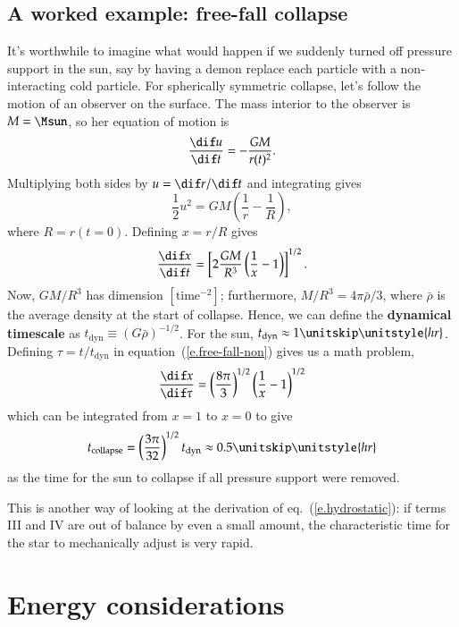 \subsection{A worked example: free-fall collapse}

It's worthwhile to imagine what would happen if we suddenly turned off pressure support in the sun, say by having a demon replace each particle with a non-interacting cold particle. For spherically symmetric collapse, let's follow the motion of an observer on the surface.  The mass interior to the observer is $M = \Msun$, so her equation of motion is
\begin{equation}\label{e.free-fall-eq-motion}
\frac{\dif u}{\dif t} = -\frac{GM}{r(t)^{2}}.
\end{equation}
Multiplying both sides by $u = \dif r/\dif t$ and integrating gives
\[
\frac{1}{2} u^{2} = GM\left(\frac{1}{r} - \frac{1}{R}\right),
\]
where $R = r(t=0)$. Defining $x = r/R$ gives
\begin{equation}\label{e.free-fall-non}
\frac{\dif x}{\dif t} = \left[2 \frac{GM}{R^{3}}\left(\frac{1}{x}-1\right)\right]^{1/2}.
\end{equation}
Now, $GM/R^{3}$ has dimension $[\textrm{time}^{-2}]$; furthermore, $M/R^{3} = 4\pi\bar{\rho}/3$, where $\bar{\rho}$ is the average density at the start of collapse.
Hence, we can define the \textbf{dynamical timescale} as $t_{\mathrm{dyn}}\equiv (G\bar{\rho})^{-1/2}$.  For the sun, $t_{\mathrm{dyn}}\approx 1\nsp\unitstyle{hr}$.  Defining $\tau = t/t_{\mathrm{dyn}}$ in equation~(\ref{e.free-fall-non}) gives us a math problem,
\[
\frac{\dif x}{\dif\tau} = \left(\frac{8\pi}{3}\right)^{1/2}\left(\frac{1}{x}-1\right)^{1/2}
\]
which can be integrated from $x = 1$ to $x=0$ to give
\[
t_{\mathrm{collapse}} = \left(\frac{3\pi}{32}\right)^{1/2}t_{\mathrm{dyn}} \approx 0.5\nsp\unitstyle{hr}
\]
as the time for the sun to collapse if all pressure support were removed.

This is another way of looking at the derivation of eq.~(\ref{e.hydrostatic}): if terms III and IV are out of balance by even a small amount, the characteristic time for the star to mechanically adjust is very rapid.

\section{Energy considerations}\label{s.energy-considerations}

